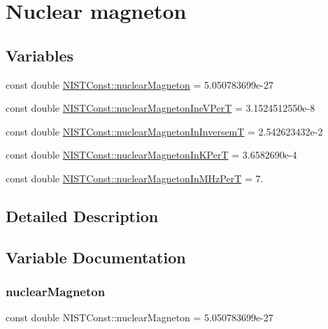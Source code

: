 \hypertarget{group___n_i_s_t_const-_nuclear_magneton}{}\section{Nuclear magneton}
\label{group___n_i_s_t_const-_nuclear_magneton}
\subsection*{Variables}
\begin{DoxyCompactItemize}
\item 
const double \mbox{\hyperlink{group___n_i_s_t_const-_nuclear_magneton_gacf9b0d2a2517113d30300e4ed7b56cc7}{N\+I\+S\+T\+Const\+::nuclear\+Magneton}} = 5.\+050783699e-\/27
\item 
const double \mbox{\hyperlink{group___n_i_s_t_const-_nuclear_magneton_ga5a31a1865923a1c14cd7f22c8973186e}{N\+I\+S\+T\+Const\+::nuclear\+Magneton\+Ine\+V\+PerT}} = 3.\+1524512550e-\/8
\item 
const double \mbox{\hyperlink{group___n_i_s_t_const-_nuclear_magneton_ga2bb8e56daaa602b5097d38b2d1ca32ad}{N\+I\+S\+T\+Const\+::nuclear\+Magneton\+In\+InversemT}} = 2.\+542623432e-\/2
\item 
const double \mbox{\hyperlink{group___n_i_s_t_const-_nuclear_magneton_gac546d7a48ca06ce3231f7cda738bb4e3}{N\+I\+S\+T\+Const\+::nuclear\+Magneton\+In\+K\+PerT}} = 3.\+6582690e-\/4
\item 
const double \mbox{\hyperlink{group___n_i_s_t_const-_nuclear_magneton_gae1ed12acbc3f50345ed451327b86b5b5}{N\+I\+S\+T\+Const\+::nuclear\+Magneton\+In\+M\+Hz\+PerT}} = 7.
\end{DoxyCompactItemize}


\subsection{Detailed Description}


\subsection{Variable Documentation}
\mbox{\label{group___n_i_s_t_const-_nuclear_magneton_gacf9b0d2a2517113d30300e4ed7b56cc7}} 
\subsubsection{\texorpdfstring{nuclear\+Magneton}{nuclearMagneton}}
{\footnotesize\ttfamily const double N\+I\+S\+T\+Const\+::nuclear\+Magneton = 5.\+050783699e-\/27}

